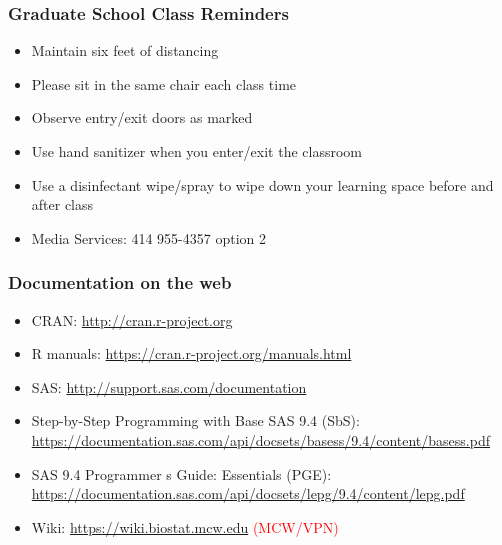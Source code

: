 \documentclass[11pt,pdftex,dvipsnames,usenames,helvetica]{beamer}
\begin{document}
\boldmath

\begin{frame}
\frametitle{Graduate School Class Reminders}

\begin{itemize}
\item Maintain six feet of distancing
\item Please sit in the same chair each class time
\item Observe entry/exit doors as marked
\item Use hand sanitizer when you enter/exit the classroom
\item Use a disinfectant wipe/spray to wipe down your learning space
  before and after class
\item Media Services: 414 955-4357 option 2
\end{itemize}

\end{frame}

\begin{frame}
\frametitle{Documentation on the web}

\begin{itemize}
\item CRAN: \url{http://cran.r-project.org}
\item R manuals: \url{https://cran.r-project.org/manuals.html}
\item SAS: \url{http://support.sas.com/documentation}
\item Step-by-Step Programming with Base SAS 9.4 (SbS): \\
\url{https://documentation.sas.com/api/docsets/basess/9.4/content/basess.pdf}
\item SAS 9.4 Programmer s Guide: Essentials (PGE): \\
\url{https://documentation.sas.com/api/docsets/lepg/9.4/content/lepg.pdf}
\item Wiki: \url{https://wiki.biostat.mcw.edu} 
\textcolor{red}{(MCW/VPN)}
\end{itemize}

\end{frame}
\end{document}
